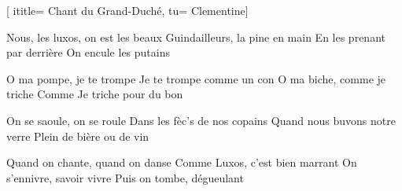  [
ititle= {Chant du Grand-Duché},
tu= {Clementine}]


\beginverse
Nous, les luxos, on est les beaux
Guindailleurs, la pine en main
En les prenant par derrière
On encule les putains
\endverse

\beginchorus
O ma pompe, je te trompe
Je te trompe comme un con
O ma biche, comme je triche
Comme Je triche pour du bon
\endchorus

\beginverse
On se saoule, on se roule
Dans les fèc's de nos copains
Quand nous buvons notre verre
Plein de bière ou de vin
\endverse

\beginverse
Quand on chante, quand on danse
Comme Luxos, c'est bien marrant
On s'ennivre, savoir vivre
Puis on tombe, dégueulant
\endverse

\endsong